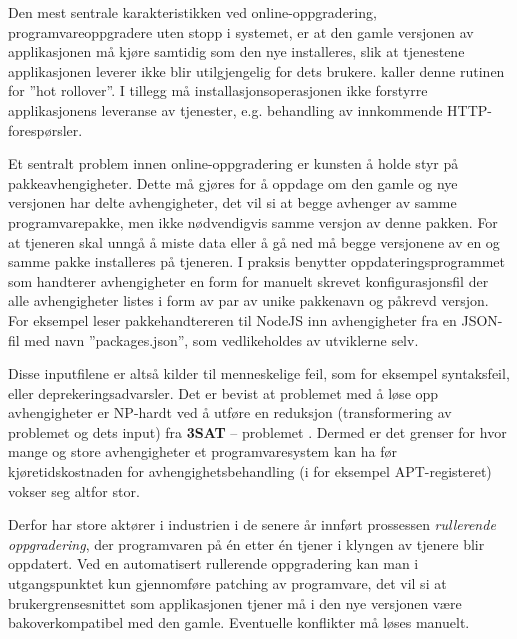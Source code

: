 Den mest sentrale karakteristikken ved online-oppgradering, programvareoppgradere uten stopp i systemet, er at den gamle versjonen av applikasjonen må kjøre samtidig som den nye installeres, slik at tjenestene applikasjonen leverer ikke blir utilgjengelig for dets brukere. \cite{choi2009} kaller denne rutinen for ''hot rollover''. I tillegg må installasjonsoperasjonen ikke forstyrre applikasjonens leveranse av tjenester, e.g. behandling av innkommende HTTP-forespørsler.

Et sentralt problem innen online-oppgradering er kunsten å holde styr på pakkeavhengigheter. Dette må gjøres for å oppdage om den gamle og nye versjonen har delte avhengigheter, det vil si at begge avhenger av samme programvarepakke, men ikke nødvendigvis samme versjon av denne pakken. For at tjeneren skal unngå å miste data eller å gå ned må begge versjonene av en og samme pakke installeres på tjeneren. I praksis benytter oppdateringsprogrammet som handterer avhengigheter en form for manuelt skrevet konfigurasjonsfil der alle avhengigheter listes i form av par av unike pakkenavn og påkrevd versjon. For eksempel leser pakkehandtereren til NodeJS inn avhengigheter fra en JSON-fil med navn ''packages.json'', som vedlikeholdes av utviklerne selv.

Disse inputfilene er altså kilder til menneskelige feil, som for eksempel syntaksfeil, eller deprekeringsadvarsler. Det er bevist at problemet med å løse opp avhengigheter er NP-hardt ved å utføre en reduksjon (transformering av problemet og dets input) fra \textbf{3SAT} -- problemet \citep{dumitracs2009upgrades}. Dermed er det grenser for hvor mange og store avhengigheter et programvaresystem kan ha før kjøretidskostnaden for avhengighetsbehandling (i for eksempel APT-registeret) vokser seg altfor stor.

Derfor har store aktører i industrien i de senere år innført prossessen \emph{rullerende oppgradering}, der programvaren på én etter én tjener i klyngen av tjenere blir oppdatert. Ved en automatisert rullerende oppgradering kan man i utgangspunktet kun gjennomføre patching av programvare, det vil si at brukergrensesnittet som applikasjonen tjener må i den nye versjonen være bakoverkompatibel med den gamle. Eventuelle konflikter må løses manuelt.
